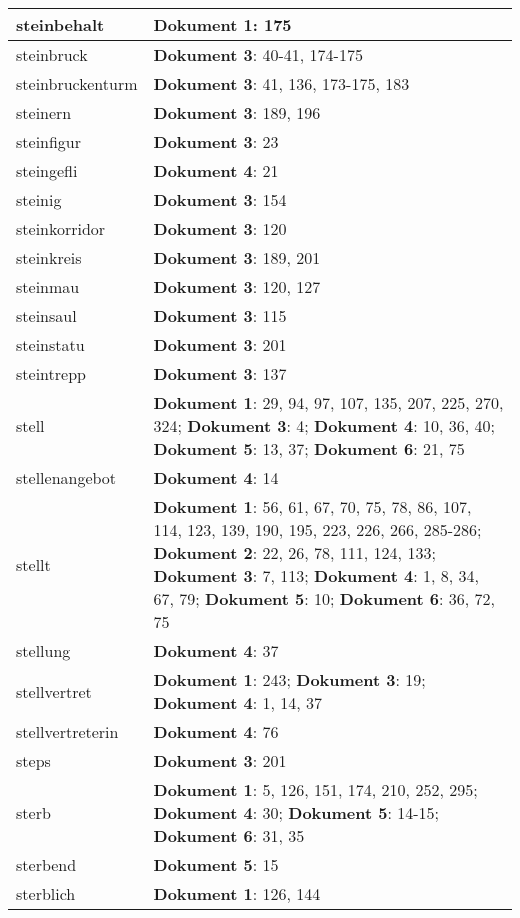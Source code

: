 \documentclass[a5paper]{article}
\begin{document}
\begin{longtable}[l]{|l|p{3in}|}
\hline
steinbehalt & \textbf{Dokument 1}: 175 \\
\hline
steinbruck & \textbf{Dokument 3}: 40-41, 174-175 \\
\hline
steinbruckenturm & \textbf{Dokument 3}: 41, 136, 173-175, 183 \\
\hline
steinern & \textbf{Dokument 3}: 189, 196 \\
\hline
steinfigur & \textbf{Dokument 3}: 23 \\
\hline
steingefli & \textbf{Dokument 4}: 21 \\
\hline
steinig & \textbf{Dokument 3}: 154 \\
\hline
steinkorridor & \textbf{Dokument 3}: 120 \\
\hline
steinkreis & \textbf{Dokument 3}: 189, 201 \\
\hline
steinmau & \textbf{Dokument 3}: 120, 127 \\
\hline
steinsaul & \textbf{Dokument 3}: 115 \\
\hline
steinstatu & \textbf{Dokument 3}: 201 \\
\hline
steintrepp & \textbf{Dokument 3}: 137 \\
\hline
stell & \textbf{Dokument 1}: 29, 94, 97, 107, 135, 207, 225, 270, 324; \textbf{Dokument 3}: 4; \textbf{Dokument 4}: 10, 36, 40; \textbf{Dokument 5}: 13, 37; \textbf{Dokument 6}: 21, 75 \\
\hline
stellenangebot & \textbf{Dokument 4}: 14 \\
\hline
stellt & \textbf{Dokument 1}: 56, 61, 67, 70, 75, 78, 86, 107, 114, 123, 139, 190, 195, 223, 226, 266, 285-286; \textbf{Dokument 2}: 22, 26, 78, 111, 124, 133; \textbf{Dokument 3}: 7, 113; \textbf{Dokument 4}: 1, 8, 34, 67, 79; \textbf{Dokument 5}: 10; \textbf{Dokument 6}: 36, 72, 75 \\
\hline
stellung & \textbf{Dokument 4}: 37 \\
\hline
stellvertret & \textbf{Dokument 1}: 243; \textbf{Dokument 3}: 19; \textbf{Dokument 4}: 1, 14, 37 \\
\hline
stellvertreterin & \textbf{Dokument 4}: 76 \\
\hline
steps & \textbf{Dokument 3}: 201 \\
\hline
sterb & \textbf{Dokument 1}: 5, 126, 151, 174, 210, 252, 295; \textbf{Dokument 4}: 30; \textbf{Dokument 5}: 14-15; \textbf{Dokument 6}: 31, 35 \\
\hline
sterbend & \textbf{Dokument 5}: 15 \\
\hline
sterblich & \textbf{Dokument 1}: 126, 144 \\

\end{longtable}
\end{document}
